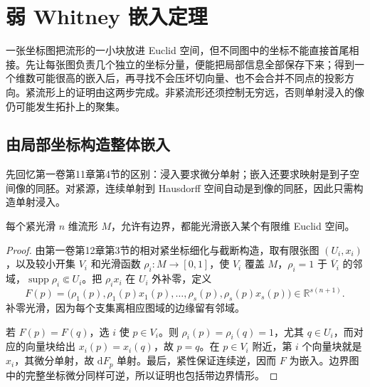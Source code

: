 
% 
% 

\section{弱 Whitney 嵌入定理}
\label{g2:sec:1501}

一张坐标图把流形的一小块放进 Euclid 空间，但不同图中的坐标不能直接首尾相接。先让每张图负责几个独立的坐标分量，便能把局部信息全部保存下来；得到一个维数可能很高的嵌入后，再寻找不会压坏切向量、也不会合并不同点的投影方向。紧流形上的证明由这两步完成。非紧流形还须控制无穷远，否则单射浸入的像仍可能发生拓扑上的聚集。

\subsection{由局部坐标构造整体嵌入}
\label{g2:subsec:1501:01}

先回忆第一卷第11章第4节的区别：浸入要求微分单射；嵌入还要求映射是到子空间像的同胚。对紧源，连续单射到 Hausdorff 空间自动是到像的同胚，因此只需构造单射浸入。

\begin{proposition}\label{g2:prop:finite-coordinate-embedding}
	每个紧光滑 \(n\) 维流形 \(M\)，允许有边界，都能光滑嵌入某个有限维 Euclid 空间。
\end{proposition}
\begin{proof}
	由第一卷第12章第3节的相对紧坐标细化与截断构造，取有限张图 \((U_i,x_i)\)，以及较小开集 \(V_i\) 和光滑函数 \(\rho_i:M\to[0,1]\)，使 \(V_i\) 覆盖 \(M\)，\(\rho_i=1\) 于 \(\overline V_i\) 的邻域，\(\operatorname{supp}\rho_i\Subset U_i\)。把 \(\rho_i x_i\) 在 \(U_i\) 外补零，定义
	\[
		F(p)=\bigl(\rho_1(p),\rho_1(p)x_1(p),\ldots,
		\rho_s(p),\rho_s(p)x_s(p)\bigr)\in\mathbb R^{s(n+1)}.
	\]
	补零光滑，因为每个支集离相应图域的边缘留有邻域。

	若 \(F(p)=F(q)\)，选 \(i\) 使 \(p\in V_i\)。则 \(\rho_i(p)=\rho_i(q)=1\)，尤其 \(q\in U_i\)，而对应的向量块给出 \(x_i(p)=x_i(q)\)，故 \(p=q\)。在 \(p\in V_i\) 附近，第 \(i\) 个向量块就是 \(x_i\)，其微分单射，故 \(\mathrm{d}F_p\) 单射。最后，紧性保证连续逆，因而 \(F\) 为嵌入。边界图中的完整坐标微分同样可逆，所以证明也包括带边界情形。
\end{proof}

